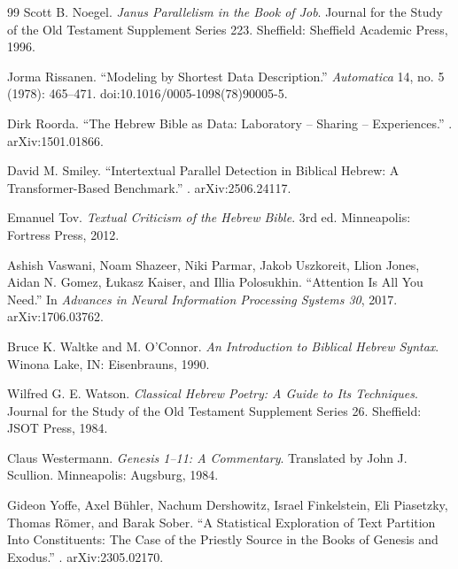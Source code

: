 \begin{thebibliography}{99}
Scott B. Noegel.
\newblock \textit{Janus Parallelism in the Book of Job}.
\newblock Journal for the Study of the Old Testament Supplement Series 223.
\newblock Sheffield: Sheffield Academic Press, 1996.

Jorma Rissanen.
\newblock ``Modeling by Shortest Data Description.''
\newblock \textit{Automatica} 14, no. 5 (1978): 465--471.
\newblock doi:10.1016/0005-1098(78)90005-5.

Dirk Roorda.
\newblock ``The Hebrew Bible as Data: Laboratory -- Sharing -- Experiences.''
.
\newblock arXiv:1501.01866.

David M. Smiley.
\newblock ``Intertextual Parallel Detection in Biblical Hebrew: A Transformer-Based Benchmark.''
.
\newblock arXiv:2506.24117.

Emanuel Tov.
\newblock \textit{Textual Criticism of the Hebrew Bible}.
\newblock 3rd ed. Minneapolis: Fortress Press, 2012.

Ashish Vaswani, Noam Shazeer, Niki Parmar, Jakob Uszkoreit, Llion Jones,
Aidan N. Gomez, Łukasz Kaiser, and Illia Polosukhin.
\newblock ``Attention Is All You Need.''
\newblock In \textit{Advances in Neural Information Processing Systems 30}, 2017.
\newblock arXiv:1706.03762.

Bruce K. Waltke and M. O'Connor.
\newblock \textit{An Introduction to Biblical Hebrew Syntax}.
\newblock Winona Lake, IN: Eisenbrauns, 1990.

Wilfred G. E. Watson.
\newblock \textit{Classical Hebrew Poetry: A Guide to Its Techniques}.
\newblock Journal for the Study of the Old Testament Supplement Series 26.
\newblock Sheffield: JSOT Press, 1984.

Claus Westermann.
\newblock \textit{Genesis 1--11: A Commentary}.
\newblock Translated by John J. Scullion.
\newblock Minneapolis: Augsburg, 1984.

Gideon Yoffe, Axel Bühler, Nachum Dershowitz, Israel Finkelstein,
Eli Piasetzky, Thomas Römer, and Barak Sober.
\newblock ``A Statistical Exploration of Text Partition Into Constituents:
The Case of the Priestly Source in the Books of Genesis and Exodus.''
.
\newblock arXiv:2305.02170.

\end{thebibliography}



